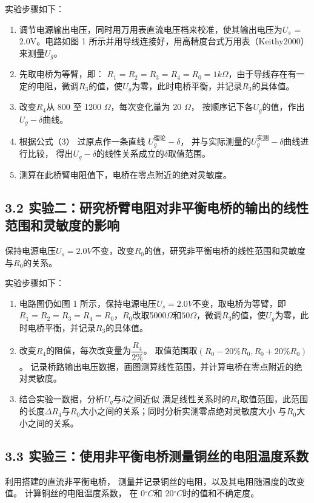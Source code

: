 \documentclass{ctexart}
\begin{document}
实验步骤如下：
\begin{enumerate}[(1)]
    \item 调节电源输出电压，同时用万用表直流电压档来校准，使其输出电压为$U_s$ = 2.0V。电路如图 1 所示并用导线连接好，用高精度台式万用表（Keithy2000）来测量$U_g$。
    \item 先取电桥为等臂，即： $R_1=R_2=R_3=R_4=R_0=1k\Omega$，由于导线存在有一定的电阻，微调$R_3$的值，使$U_g$为零，此时电桥平衡，并记录$R_3$的具体值。
    \item 改变$R_4$从 800 至 1200 $\Omega$，每次变化量为 20 $\Omega$， 按顺序记下各$U_g$的值，作出$U_g - \delta$曲线。
    \item 根据公式（3） 过原点作一条直线 $U_g^{\text{理论}} - \delta$， 并与实际测量的$U_g^{\text{实测}} - \delta$曲线进行比较， 得出$U_g - \delta$的线性关系成立的$\delta$取值范围。
    \item 测算在此桥臂电阻值下，电桥在零点附近的绝对灵敏度。
\end{enumerate}

\subsection*{3.2 \quad 实验二：研究桥臂电阻对非平衡电桥的输出的线性范围和灵敏度的影响}
保持电源电压$U_s=2.0V$不变，改变$R_0$的值，研究非平衡电桥的线性范围和灵敏度与$R_0$的关系。

实验步骤如下：
\begin{enumerate}[(1)]
    \item 电路图仍如图 1 所示，保持电源电压$U_s=2.0V$不变，取电桥为等臂，即$R_1=R_2=R_3=R_4=R_0$，$R_0$改取5000$\Omega$和$50\Omega$，微调$R_3$的值，使$U_g$为零，此时电桥平衡，并记录$R_3$的具体值。
    \item 改变$R_4$的阻值，每次改变量为$\dfrac{R_4}{2\%}$。 取值范围取$(R_0 −20\%R_0, R_0 + 20\%R_0)$。 记录桥路输出电压数据，画图测算线性范围，并计算电桥在零点附近的绝对灵敏度。
    \item 结合实验一数据，分析$U_g$与$\delta$之间近似 满足线性关系时的$R_4$取值范围，此范围的长度$\Delta R_4$与$R_0$大小之间的关系；同时分析实测零点绝对灵敏度大小 与$R_0$大小之间的关系。
\end{enumerate}

\subsection*{3.3 \quad 实验三：使用非平衡电桥测量铜丝的电阻温度系数}
利用搭建的直流非平衡电桥， 测量并记录铜丝的电阻，以及其电阻随温度的改变值。 计算铜丝的电阻温度系数， 在 0$^\circ C$和 20$^\circ C$时的值和不确定度。
\end{document}
